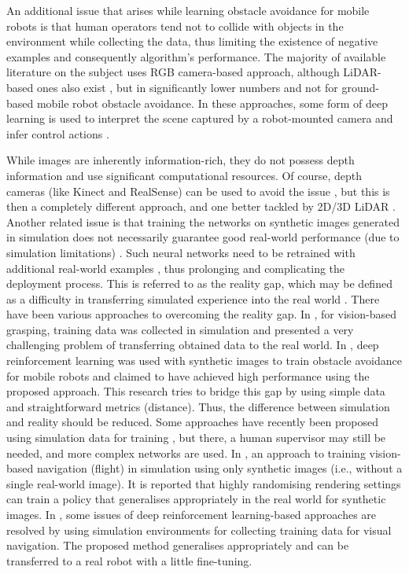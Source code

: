 An additional issue that arises while learning obstacle avoidance for mobile robots is that human operators tend not to collide with objects in the environment while collecting the data, thus limiting the existence of negative examples and consequently algorithm's performance.
The majority of available literature on the subject uses RGB camera-based approach, although LiDAR-based ones also exist \cite{Maturana2015}, but in significantly lower numbers and not for ground-based mobile robot obstacle avoidance. In these approaches,  some form of deep learning is used to interpret the scene captured by a robot-mounted camera and infer control actions \cite{Sullivan2017,Hadsell2009,Giusti2016,Tai2016,Gandhi2017,Liu2017}. 

While images are inherently information-rich, they do not possess depth information and use significant computational resources. Of course, depth cameras (like Kinect and RealSense) can be used to avoid the issue \cite{Tai2016,Correa2012}, but this is then a completely different approach, and one better tackled by 2D/3D LiDAR \cite{Bousmalis2018}. Another related issue is that training the networks on synthetic images generated in simulation does not necessarily guarantee good real-world performance (due to simulation limitations) \cite{Bousmalis2017,Bousmalis2018}. Such neural networks need to be retrained with additional real-world examples \cite{Gandhi2017}, thus prolonging and complicating the deployment process. This is referred to as the reality gap, which may be defined as a difficulty in transferring simulated experience into the real world \cite{Bousmalis2018}. There have been various approaches to overcoming the reality gap. In \cite{Bousmalis2018}, for vision-based grasping, training data was collected in simulation and presented a very challenging problem of transferring obtained data to the real world. In \cite{Xie2017}, deep reinforcement learning was used with synthetic images to train obstacle avoidance for mobile robots and claimed to have achieved high performance using the proposed approach. This research tries to bridge this gap by using simple data and straightforward metrics (distance). Thus, the difference between simulation and reality should be reduced. Some approaches have recently been proposed using simulation data for training \cite{Bousmalis2018,Zhu2017}, but there, a human supervisor may still be needed, and more complex networks are used. In \cite{Zhu2017}, an approach to training vision-based navigation (flight) in simulation using only synthetic images (i.e., without a single real-world image). It is reported that highly randomising rendering settings can train a policy that generalises appropriately in the real world for synthetic images. In \cite{Koenig2004}, some issues of deep reinforcement learning-based approaches are resolved by using simulation environments for collecting training data for visual navigation. The proposed method generalises appropriately and can be transferred to a real robot with a little fine-tuning.

